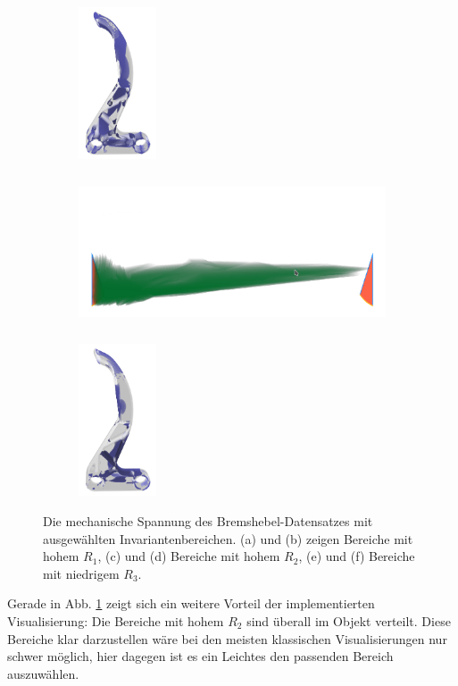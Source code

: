 \documentclass[a4paper,fontsize=12pt,toc=bib,halfparskip]{scrartcl}
\begin{document}
\begin{figure}
\begin{subfigure}{0.49\textwidth}
		\centering
		\includegraphics[height=4.5cm]{pictures/results/Bremshebel_R_Object2.png}
		\subcaption{}
		\label{BremshebelRObject2}
	\end{subfigure}
	\medskip
	\begin{subfigure}{0.49\textwidth}
		\centering
		\includegraphics[height=4.5cm]{pictures/results/Bremshebel_R_InvariantSpace3.png}
		\subcaption{}
		\label{BremshebelRInvariant3}
	\end{subfigure}
	\hspace*{\fill}
	\begin{subfigure}{0.49\textwidth}
		\centering
		\includegraphics[height=4.5cm]{pictures/results/Bremshebel_R_Object3.png}
		\subcaption{}
		\label{BremshebelRObject3}
	\end{subfigure}
	\caption{Die mechanische Spannung des Bremshebel-Datensatzes mit ausgew\"ahlten Invariantenbereichen. (a) und (b) zeigen Bereiche mit hohem $R_1$, (c) und (d) Bereiche mit hohem $R_2$, (e) und (f) Bereiche mit niedrigem $R_3$.}
	\label{BremshebelRInteraction}
\end{figure}

Gerade in Abb. \ref{BremshebelRObject2} zeigt sich ein weitere Vorteil der implementierten Visualisierung: Die Bereiche mit hohem $R_2$ sind \"uberall im Objekt verteilt. Diese Bereiche klar darzustellen w\"are bei den meisten klassischen Visualisierungen nur schwer m\"oglich, hier dagegen ist es ein Leichtes den passenden Bereich auszuw\"ahlen.
\end{document}
